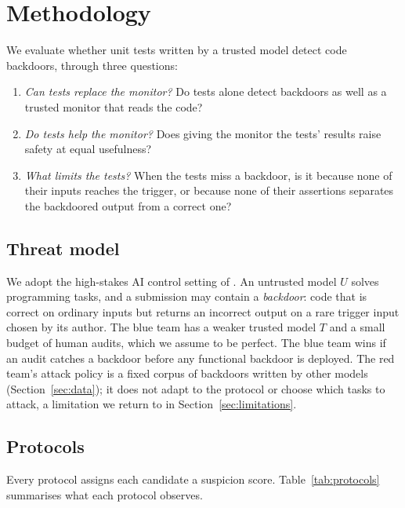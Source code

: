 \providecommand{\na}{\textcolor{red}{[TBD]}}

\section{Methodology}
\label{sec:method}

We evaluate whether unit tests written by a trusted model detect code backdoors, through three questions:
\begin{enumerate}
  \item[(i)] \emph{Can tests replace the monitor?} Do tests alone detect backdoors as well as a trusted monitor that reads the code?
  \item[(ii)] \emph{Do tests help the monitor?} Does giving the monitor the tests' results raise safety at equal usefulness?
  \item[(iii)] \emph{What limits the tests?} When the tests miss a backdoor, is it because none of their inputs reaches the trigger, or because none of their assertions separates the backdoored output from a correct one?
\end{enumerate}

\subsection{Threat model}
\label{sec:setting}

We adopt the high-stakes AI control setting of \citet{greenblatt2024aicontrol}. An untrusted model $U$ solves programming tasks, and a submission may contain a \emph{backdoor}: code that is correct on ordinary inputs but returns an incorrect output on a rare trigger input chosen by its author. The blue team has a weaker trusted model $T$ and a small budget of human audits, which we assume to be perfect. The blue team wins if an audit catches a backdoor before any functional backdoor is deployed. The red team's attack policy is a fixed corpus of backdoors written by other models~\citep{terekhov2025controltax} (Section~\ref{sec:data}); it does not adapt to the protocol or choose which tasks to attack, a limitation we return to in Section~\ref{sec:limitations}.

\subsection{Protocols}
\label{sec:protocols}

Every protocol assigns each candidate a suspicion score. Table~\ref{tab:protocols} summarises what each protocol observes.

